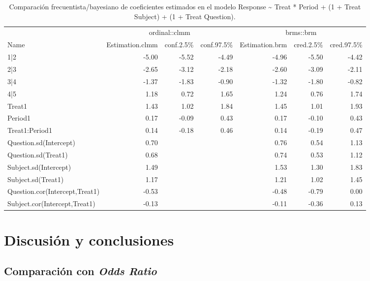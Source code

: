 \documentclass[
  12pt,
  a4paper,
  extrafontsizes,
  onecolumn,
  openright,
  table]{memoir}
\begin{document}
\hypertarget{tbl-model-comp}{}
\begin{longtable}{lrrrrrr}
\caption{\label{tbl-model-comp}Comparación frecuentista/bayesiano de coeficientes estimados en el
modelo Response \textasciitilde{} Treat * Period + (1 + Treat \textbar{}
Subject) + (1 + Treat \textbar{} Question). }\tabularnewline

\toprule
 & \multicolumn{3}{c}{ordinal::clmm} & \multicolumn{3}{c}{brms::brm} \\ 
\cmidrule(lr){2-4} \cmidrule(lr){5-7}
Name & Estimation.clmm & conf.2.5\% & conf.97.5\% & Estimation.brm & cred.2.5\% & cred.97.5\% \\ 
\midrule
1|2 & -5.00 & -5.52 & -4.49 & -4.96 & -5.50 & -4.42 \\ 
2|3 & -2.65 & -3.12 & -2.18 & -2.60 & -3.09 & -2.11 \\ 
3|4 & -1.37 & -1.83 & -0.90 & -1.32 & -1.80 & -0.82 \\ 
4|5 & 1.18 & 0.72 & 1.65 & 1.24 & 0.76 & 1.74 \\ 
Treat1 & 1.43 & 1.02 & 1.84 & 1.45 & 1.01 & 1.93 \\ 
Period1 & 0.17 & -0.09 & 0.43 & 0.17 & -0.10 & 0.43 \\ 
Treat1:Period1 & 0.14 & -0.18 & 0.46 & 0.14 & -0.19 & 0.47 \\ 
Question.sd(Intercept) & 0.70 &  &  & 0.76 & 0.54 & 1.13 \\ 
Question.sd(Treat1) & 0.68 &  &  & 0.74 & 0.53 & 1.12 \\ 
Subject.sd(Intercept) & 1.49 &  &  & 1.53 & 1.30 & 1.83 \\ 
Subject.sd(Treat1) & 1.17 &  &  & 1.21 & 1.02 & 1.45 \\ 
Question.cor(Intercept,Treat1) & -0.53 &  &  & -0.48 & -0.79 & 0.00 \\ 
Subject.cor(Intercept,Treat1) & -0.13 &  &  & -0.11 & -0.36 & 0.13 \\ 
\bottomrule
\end{longtable}

\normalsize


\hypertarget{sec-conclusiones}{%
\chapter{Discusión y conclusiones}\label{sec-conclusiones}}

\hypertarget{sec-or-4}{%
\section{\texorpdfstring{Comparación con \emph{Odds
Ratio}}{Comparación con Odds Ratio}}\label{sec-or-4}}
\end{document}
